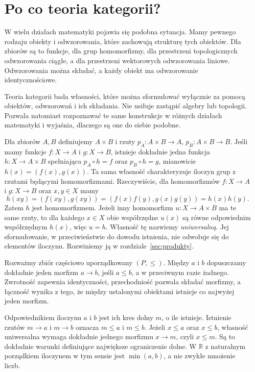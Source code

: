 \section{Po co teoria kategorii?}\label{sec:motywacja}

W wielu działach matematyki pojawia się podobna sytuacja. Mamy pewnego rodzaju obiekty i odwzorowania, które zachowują strukturę tych obiektów. Dla zbiorów są to funkcje, dla grup homomorfizmy, dla przestrzeni topologicznych odwzorowania ciągłe, a dla przestrzeni wektorowych odwzorowania liniowe. Odwzorowania można składać, a każdy obiekt ma odwzorowanie identycznościowe.

Teoria kategorii bada własności, które można sformułować wyłącznie za pomocą obiektów, odwzorowań i ich składania. Nie usiłuje zastąpić algebry lub topologii. Pozwala natomiast rozpoznawać te same konstrukcje w różnych działach matematyki i wyjaśnia, dlaczego są one do siebie podobne.

\begin{przyklad}
Dla zbiorów $A,B$ definiujemy $A\times B$ i rzuty $p_A:A\times B\to A$, $p_B:A\times B\to B$. Jeśli mamy funkcje $f:X\to A$ i $g:X\to B$, istnieje dokładnie jedna funkcja $h:X\to A\times B$ spełniająca $p_A\circ h=f$ oraz $p_B\circ h=g$, mianowicie $h(x)=(f(x),g(x))$. Ta sama własność charakteryzuje iloczyn grup z rzutami będącymi homomorfizmami. Rzeczywiście, dla homomorfizmów $f:X\to A$ i $g:X\to B$ oraz $x,y\in X$ mamy
\[
h(xy)=(f(xy),g(xy))=(f(x)f(y),g(x)g(y))=h(x)h(y).
\]
Zatem $h$ jest homomorfizmem. Jeżeli inny homomorfizm $u:X\to A\times B$ ma te same rzuty, to dla każdego $x\in X$ obie współrzędne $u(x)$ są równe odpowiednim współrzędnym $h(x)$, więc $u=h$. Własność tę nazwiemy \emph{uniwersalną}. Jej sformułowanie, w przeciwieństwie do dowodu istnienia, nie odwołuje się do elementów iloczynu. Rozwiniemy ją w rozdziale~\ref{sec:produkty}.
\end{przyklad}

\begin{przyklad}\label{cat:ex:motywacja-porzadek}
Rozważmy zbiór częściowo uporządkowany $(P,\leq)$. Między $a$ i $b$ dopuszczamy dokładnie jeden morfizm $a\to b$, jeśli $a\leq b$, a w przeciwnym razie żadnego. Zwrotność zapewnia identyczności, przechodniość pozwala składać morfizmy, a łączność wynika z tego, że między ustalonymi obiektami istnieje co najwyżej jeden morfizm.

Odpowiednikiem iloczynu $a$ i $b$ jest ich kres dolny $m$, o ile istnieje. Istnienie rzutów $m\to a$ i $m\to b$ oznacza $m\leq a$ i $m\leq b$. Jeżeli $x\leq a$ oraz $x\leq b$, własność uniwersalna wymaga dokładnie jednego morfizmu $x\to m$, czyli $x\leq m$. Są to dokładnie warunki definiujące największe ograniczenie dolne. W $\mathbb R$ z naturalnym porządkiem iloczynem w tym sensie jest $\min(a,b)$, a nie zwykłe mnożenie liczb.
\end{przyklad}

